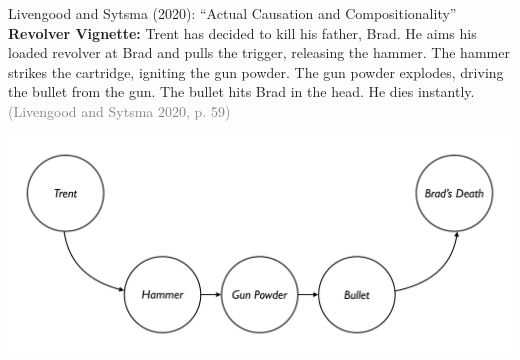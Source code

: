 \documentclass[xcolor=table,9pt,aspectratio=169]{beamer}
\begin{document}
\begin{frame}{\vspace*{10mm}Livengood and Sytsma (2020): ``Actual Causation and Compositionality''}
\vspace*{-5mm}
\textbf{Revolver Vignette:} Trent has decided to kill his father, Brad. He aims his loaded revolver at Brad and pulls the trigger, releasing the hammer. The hammer strikes the cartridge, igniting the gun powder. The gun powder explodes, driving the bullet from the gun. The bullet hits Brad in the head. He dies instantly. \textcolor{gray}{(Livengood and Sytsma 2020, p. 59)}
\begin{center}
   \includegraphics[width=0.75\linewidth]{figures/revolver.pdf}
\end{center}
\end{frame}
\end{document}
